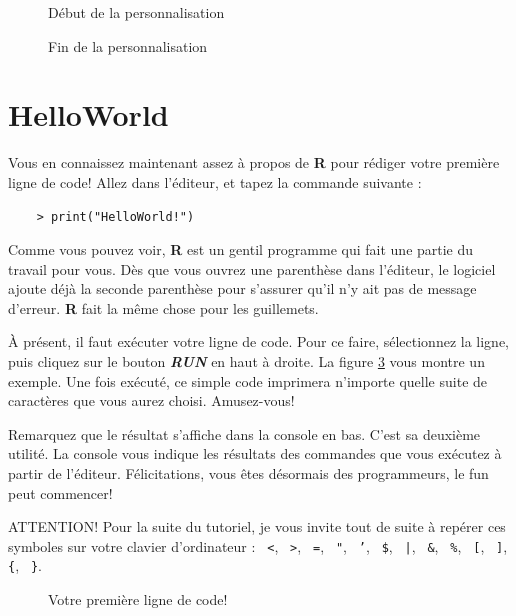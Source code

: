 \documentclass[10.5pt,a4paper]{article}
\newcommand{\rcode}[1]{\texttt{\color{rstudio} #1}}
\begin{document}
\begin{figure}[H]
  \centering
  \caption{Début de la personnalisation}
  \label{rstudiod3}
\end{figure}

\begin{figure}[H]
  \centering
  \caption{Fin de la personnalisation}
  \label{rstudiod4}
\end{figure}

\section{HelloWorld}

Vous en connaissez maintenant assez à propos de \textbf{R} pour rédiger votre première ligne de code! Allez dans l'éditeur, et tapez la commande suivante :
    \begin{lstlisting}
    > print("HelloWorld!")
    \end{lstlisting}
   
 Comme vous pouvez voir, \textbf{R} est un gentil programme qui fait une partie du travail pour vous. Dès que vous ouvrez une parenthèse dans l'éditeur, le logiciel ajoute déjà la seconde parenthèse pour s'assurer qu'il n'y ait pas de message d'erreur. \textbf{R} fait la même chose pour les guillemets. 
   
À présent, il faut exécuter votre ligne de code. Pour ce faire, sélectionnez la ligne, puis cliquez sur le bouton \textit{\textbf{RUN}} en haut à droite. La figure \ref{rstudiod5} vous montre un exemple. Une fois exécuté, ce simple code imprimera n'importe quelle suite de caractères que vous aurez choisi. Amusez-vous!

Remarquez que le résultat s'affiche dans la console en bas. C'est sa deuxième utilité. La console vous indique les résultats des commandes que vous exécutez à partir de l'éditeur. Félicitations, vous êtes désormais des programmeurs, le fun peut commencer! 

ATTENTION! Pour la suite du tutoriel, je vous invite tout de suite à repérer ces symboles sur votre clavier d'ordinateur : \rcode{<}, \rcode{>}, \rcode{=}, \rcode{"}, \rcode{'}, \rcode{\$}, \rcode{|}, \rcode{\&}, \rcode{\%}, \rcode{[}, \rcode{]}, \rcode{\{}, \rcode{\}}.

\begin{figure}[H]
  \centering
  \caption{Votre première ligne de code!}
  \label{rstudiod5}
\end{figure}
\end{document}
